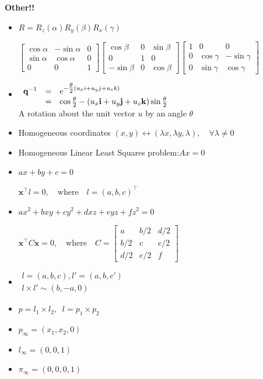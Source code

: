 \documentclass{../cheat}
\begin{document}
\begin{multicols}{3}
	\textbf{Other!!}
	\setlength{\gapspace}{0.3\columnwidth}
	\begin{itemize}
			\item {} $R=R_z(\alpha) R_y(\beta) R_x(\gamma)$\\
			\centerline{$\begin{bmatrix}
				\cos\alpha & -\sin\alpha & 0 \\
				\sin\alpha & \cos\alpha & 0 \\
				0 & 0 & 1
				\end{bmatrix}\begin{bmatrix}
				\cos\beta & 0 & \sin\beta \\
				0 & 1 & 0\\
				-\sin\beta & 0 & \cos\beta
				\end{bmatrix}\begin{bmatrix}
				1 & 0 & 0\\
				0 & \cos\gamma & -\sin\gamma \\
				0 & \sin\gamma & \cos\gamma		
				\end{bmatrix}$}
		\item {} $\begin{array}{l c l}
			 \mathbf{q}^{-1} & = & e^{-\tfrac{\theta}{2}{(u_xi + u_yj + u_zk)}}\\
			 & = & \cos \tfrac{\theta}{2}-(u_x\mathbf{i}+u_y\mathbf{j}+u_z\mathbf{k})\sin \tfrac{\theta}{2}
			\end{array}$\\
			A rotation about the unit vector $u$ by an angle $\theta$
		\item Homogeneous coordinates \quad
			$ (x,y) \leftrightarrow  (\lambda x, \lambda y, \lambda ), \quad \forall \lambda \neq 0$
		\item Homogeneous Linear Least Squares problem:\quad $Ax=0$
		\item {} $ax + by + c = 0$ \\
			\centerline{$\mathbf{x}^\top l = 0,\quad  \textrm{where}\quad l = (a,b,c)^\top$}
		\item {} $ax^2+bxy + cy^2 + dxz + eyz + fz^2 = 0$\\
			\centerline{$\mathbf{x}^{\top} C \mathbf{x} = 0, \quad  \textrm{where}\quad C = \begin{bmatrix}
			a & b/2 & d/2 \\  b/2 & c & e/2 \\  d/2 & e/2 & f \end{bmatrix}$}
		\item {} $\begin{array}{l} 
			 l=(a,b,c), l'=(a,b,c') \\
			l\times l'\sim (b,-a,0)
			\end{array}$
		\item {} $p=l_1 \times l_2, \;\; l=p_1 \times p_2$
		\item {} $p_\infty=(x_1, x_2, 0)$
		\item {} $l_\infty=(0, 0, 1)$
		\item {} $\pi_\infty=(0, 0, 0, 1)$
	\end{itemize}	
	

\end{multicols}
\end{document}
